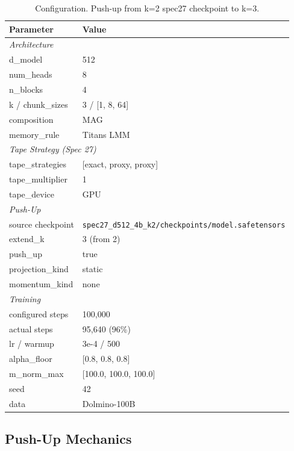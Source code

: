 \documentclass[11pt,a4paper]{article}
\begin{document}
\begin{table}[H]
\centering
\caption{Configuration. Push-up from k=2 spec27 checkpoint to k=3.}
\begin{tabular}{ll}
\toprule
\textbf{Parameter} & \textbf{Value} \\
\midrule
\multicolumn{2}{l}{\textit{Architecture}} \\
\quad d\_model & 512 \\
\quad num\_heads & 8 \\
\quad n\_blocks & 4 \\
\quad k / chunk\_sizes & 3 / [1, 8, 64] \\
\quad composition & MAG \\
\quad memory\_rule & Titans LMM \\
\midrule
\multicolumn{2}{l}{\textit{Tape Strategy (Spec 27)}} \\
\quad tape\_strategies & [exact, proxy, proxy] \\
\quad tape\_multiplier & 1 \\
\quad tape\_device & GPU \\
\midrule
\multicolumn{2}{l}{\textit{Push-Up}} \\
\quad source checkpoint & \texttt{spec27\_d512\_4b\_k2/checkpoints/model.safetensors} \\
\quad extend\_k & 3 (from 2) \\
\quad push\_up & true \\
\quad projection\_kind & static \\
\quad momentum\_kind & none \\
\midrule
\multicolumn{2}{l}{\textit{Training}} \\
\quad configured steps & 100,000 \\
\quad actual steps & 95,640 (96\%) \\
\quad lr / warmup & 3e-4 / 500 \\
\quad alpha\_floor & [0.8, 0.8, 0.8] \\
\quad m\_norm\_max & [100.0, 100.0, 100.0] \\
\quad seed & 42 \\
\quad data & Dolmino-100B \\
\bottomrule
\end{tabular}
\end{table}

\subsection{Push-Up Mechanics}
\end{document}
